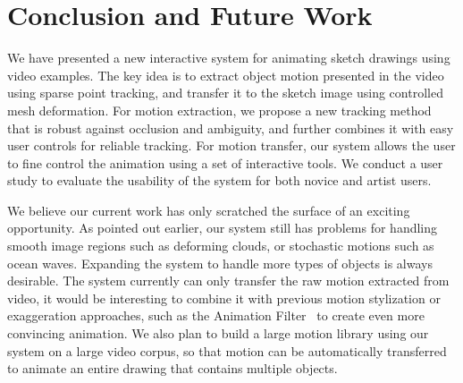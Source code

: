 \section{Conclusion and Future Work}

We have presented a new interactive system for animating sketch drawings using video examples. The key idea is to extract object motion presented in the video using sparse point tracking, and transfer it to the sketch image using controlled mesh deformation. For motion extraction, we propose a new tracking method that is robust against occlusion and ambiguity, and further combines it with easy user controls for reliable tracking. For motion transfer, our system allows the user to fine control the animation using a set of interactive tools.  
We conduct a user study to evaluate the usability of the system for both novice and artist users. 

We believe our current work has only scratched the surface of an exciting opportunity. As pointed out earlier, our system still has problems for handling smooth image regions such as deforming clouds, or stochastic motions such as ocean waves.  Expanding the system to handle more types of objects is always desirable. The system currently can only transfer the raw motion extracted from video, it would be interesting to combine it with previous motion stylization or exaggeration approaches, such as the Animation Filter~\cite{Wang:2006} to create even more convincing animation. We also plan to build a large motion library using our system on a large video corpus, so that motion can be automatically transferred to animate an entire drawing that contains multiple objects. 
